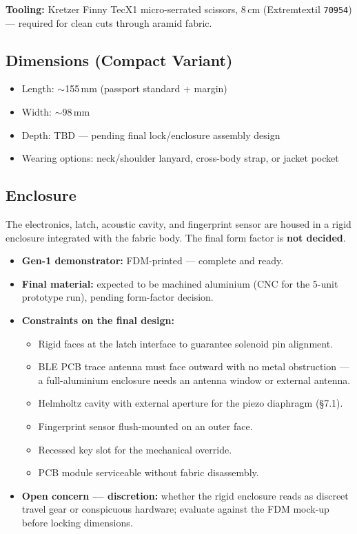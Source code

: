 \documentclass[11pt,a4paper]{article}
\newcommand{\partno}[1]{\texttt{#1}}
\begin{document}
\textbf{Tooling:} Kretzer Finny TecX1 micro-serrated scissors, 8\,cm (Extremtextil \partno{70954}) --- required for clean cuts through aramid fabric.

\subsection{Dimensions (Compact Variant)}

\begin{itemize}
  \item Length: $\sim$155\,mm (passport standard + margin)
  \item Width: $\sim$98\,mm
  \item Depth: TBD --- pending final lock/enclosure assembly design
  \item Wearing options: neck/shoulder lanyard, cross-body strap, or jacket pocket
\end{itemize}

\subsection{Enclosure}

The electronics, latch, acoustic cavity, and fingerprint sensor are housed in a rigid enclosure integrated with the fabric body. The final form factor is \textbf{not decided}.

\begin{itemize}
  \item \textbf{Gen-1 demonstrator:} FDM-printed --- complete and ready.
  \item \textbf{Final material:} expected to be machined aluminium (CNC for the 5-unit prototype run), pending form-factor decision.
  \item \textbf{Constraints on the final design:}
  \begin{itemize}
    \item Rigid faces at the latch interface to guarantee solenoid pin alignment.
    \item BLE PCB trace antenna must face outward with no metal obstruction --- a full-aluminium enclosure needs an antenna window or external antenna.
    \item Helmholtz cavity with external aperture for the piezo diaphragm (\S7.1).
    \item Fingerprint sensor flush-mounted on an outer face.
    \item Recessed key slot for the mechanical override.
    \item PCB module serviceable without fabric disassembly.
  \end{itemize}
  \item \textbf{Open concern --- discretion:} whether the rigid enclosure reads as discreet travel gear or conspicuous hardware; evaluate against the FDM mock-up before locking dimensions.
\end{itemize}
\end{document}
